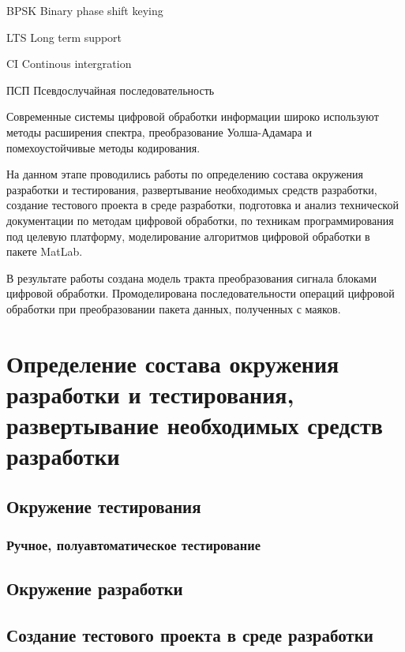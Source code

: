 \documentclass[utf8,usehyperref,12pt]{G7-32}
\begin{document}
\Abbreviations %

\begin{abbreviation}
\item[BPSK] Binary phase shift keying
\item[LTS] Long term support
\item[CI] Continous intergration
\item[ПСП] Псевдослучайная последовательность
\end{abbreviation}

\Introduction
Современные системы цифровой обработки информации широко используют методы расширения спектра, преобразование Уолша-Адамара и помехоустойчивые методы кодирования. 

На данном этапе проводились работы по определению состава окружения разработки и тестирования, развертывание необходимых средств разработки, создание тестового проекта в среде разработки, подготовка и анализ технической документации по методам цифровой обработки, по техникам программирования под целевую платформу, моделирование алгоритмов цифровой обработки в пакете MatLab.

В результате работы создана модель тракта преобразования сигнала блоками цифровой обработки. Промоделирована последовательности операций цифровой обработки при преобразовании пакета данных, полученных с маяков.

\mainmatter %
\chapter{Определение состава окружения разработки и тестирования, развертывание необходимых средств разработки}
\section{Окружение тестирования}
\subsection{Ручное, полуавтоматическое тестирование}
\section{Окружение разработки}
\section{Создание тестового проекта в среде разработки}
\end{document}
